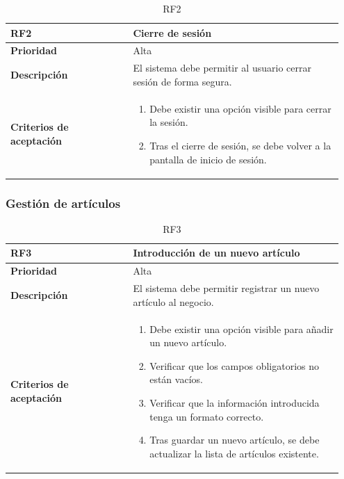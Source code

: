 \begin{table}[htb!]
	\centering %
	\begin{tabular}{|p{0.35\linewidth}|p{0.6\linewidth}|}
		\hline
		\rowcolor{grayshade} \textbf{RF2} & \textbf{Cierre de sesión} \\
		\hline
		\textbf{Prioridad} & Alta \\
		\hline
		\textbf{Descripción} & El sistema debe permitir al usuario cerrar sesión de forma segura.  \\
		\hline
		\vspace{0.5mm}
		\textbf{Criterios de aceptación} & 
		\begin{minipage}[t]{0.9\linewidth}
			\begin{enumerate}
				\item Debe existir una opción visible para cerrar la sesión.
				\item Tras el cierre de sesión, se debe volver a la pantalla de inicio de sesión.
			\end{enumerate}
			\vspace{2mm}
		\end{minipage} \\
		\hline
	\end{tabular}
	\caption{RF2}
\end{table}

\subsubsection{Gestión de artículos}

\begin{table}[htb!]
	\centering %
	\begin{tabular}{|p{0.35\linewidth}|p{0.6\linewidth}|}
		\hline
		\rowcolor{grayshade} \textbf{RF3} & \textbf{Introducción de un nuevo artículo} \\
		\hline
		\textbf{Prioridad} & Alta \\
		\hline
		\textbf{Descripción} & El sistema debe permitir registrar un nuevo artículo al negocio.\\
		\hline
		\vspace{0.5mm}
		\textbf{Criterios de aceptación} & 
		\begin{minipage}[t]{0.9\linewidth}
			\begin{enumerate}
				\item Debe existir una opción visible para añadir un nuevo artículo.
				\item Verificar que los campos obligatorios no están vacíos.
				\item Verificar que la información introducida tenga un formato correcto.
				\item Tras guardar un nuevo artículo, se debe actualizar la lista de artículos existente. 
			\end{enumerate}
			\vspace{2mm}
		\end{minipage} \\
		\hline
	\end{tabular}
	\caption{RF3}
\end{table}

